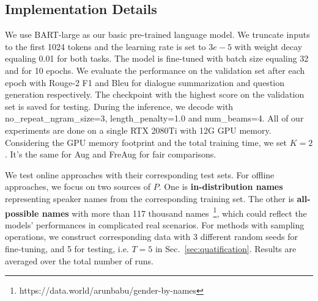 \subsection{Implementation Details}

We use BART-large
as our basic pre-trained language model. We truncate inputs to the first 1024 tokens and the learning rate is set to $3e-5$ with weight decay equaling 0.01 for both tasks. The model is fine-tuned with batch size equaling 32 and for 10 epochs. We evaluate the performance on the validation set after each epoch with Rouge-2 F1 and Bleu for dialogue summarization and question generation respectively. The checkpoint with the highest score on the validation set is saved for testing. During the inference, we decode with no\_repeat\_ngram\_size=3, length\_penalty=1.0 and num\_beams=4.
All of our experiments are done on a single RTX 2080Ti with 12G GPU memory.
Considering the GPU memory footprint and the total training time, we set $K=2$. It's the same for Aug and FreAug for fair comparisons.

We test online approaches with their corresponding test sets. For offline approaches, we focus on two sources of $P$. One is \textbf{in-distribution names} representing speaker names from the corresponding training set. The other is \textbf{all-possible names} with more than 117 thousand names~\footnote{https://data.world/arunbabu/gender-by-names}, which could reflect the models' performances in complicated real scenarios. 
For methods with sampling operations, we construct corresponding data with 3 different random seeds for fine-tuning, and 5 for testing, i.e. $T=5$ in Sec.~\ref{sec:quatification}. Results are averaged over the total number of runs.



